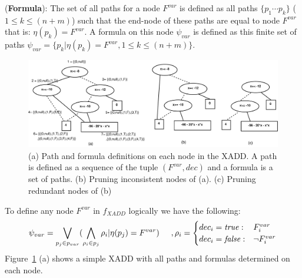 \documentclass[twoside,11pt]{article}
\newenvironment{mydef}[1][Definition]{\begin{trivlist}
\item[\hskip \labelsep {\bfseries #1}]}{\end{trivlist}}
\begin{document}
\begin{mydef}(\textbf{Formula}):
The set of all paths for a node $F^{var}$ is defined as all paths $\lbrace p_1 \cdots p_k \rbrace$ ($1 \leq k \leq (n+m)$) such that the end-node of these paths are equal to node $F^{var}$ that is: $\eta(p_k) = F^{var}$. A formula on this node $\psi_{var} $ is defined as this finite set of paths $\psi_{var} = \lbrace p_k | \eta(p_k) = F^{var}, 1 \leq k \leq (n+m) \rbrace$. 
\end{mydef}
\vspace{10mm}
\begin{figure}[t!]
\centering
\vspace{-3mm}
\includegraphics[width=1.0\textwidth]{Figures1/diagrams/path_formula2.pdf}
\vspace{-9mm}
\caption{\footnotesize (a) Path and formula definitions on each node in the XADD. A path is defined as a sequence of the tuple $(F^{var},\mathit{dec})$ and a formula is a set of paths. (b) Pruning inconsistent nodes of (a). (c) Pruning redundant nodes of (b)}
\label{fig:path_formula}
\vspace{-4mm}
\end{figure}
\vspace{-7mm}
To define any node $F^{var}$ in $f_{XADD}$ logically we have the following:
\begin{equation*}
\psi_{var} = \bigvee_{p_j \in p_{var}} (\bigwedge_{\rho_i \in p_j} \rho_i |\eta(p_j) = F^{var})
\hspace{5mm},
\rho_i =
\begin{cases}
  dec_i = \mathit{true}: & F_i^{var} \\ 
dec_i = \mathit{false}: & \neg F_i^{var} \\ 
\end{cases}
\end{equation*} 
Figure~\ref{fig:path_formula} (a) shows a simple XADD with all paths and formulas determined on each node. %
\end{document}
